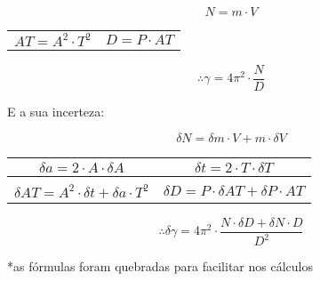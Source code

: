 \[ N = m \cdot V \]

\begin{table}[H]
    \centering
    \begin{tabular}{ c|c  }
         $AT = A^2 \cdot T^2$ &
         $D = P \cdot AT$
    \end{tabular}
\end{table}

\[ \therefore \gamma = 4\pi^2 \cdot \frac{N}{D} \]

E a sua incerteza:

\[ \delta N = \delta m \cdot V + m \cdot \delta V \]

\begin{table}[H]
    \centering
    \begin{tabular}{ c|c  }
         $\delta a = 2 \cdot A \cdot \delta A$ &
         $\delta t = 2 \cdot T \cdot \delta T$\\
         \hline \\
         $\delta AT = A^2 \cdot \delta t + \delta a \cdot T^2$ &
         $\delta D = P \cdot \delta AT + \delta P \cdot AT$\\
    \end{tabular}
\end{table}

\[ \therefore \delta \gamma = 4\pi^2 \cdot \frac{N \cdot \delta D + \delta N \cdot D}{D^2} \]

*as fórmulas foram quebradas para facilitar nos cálculos
